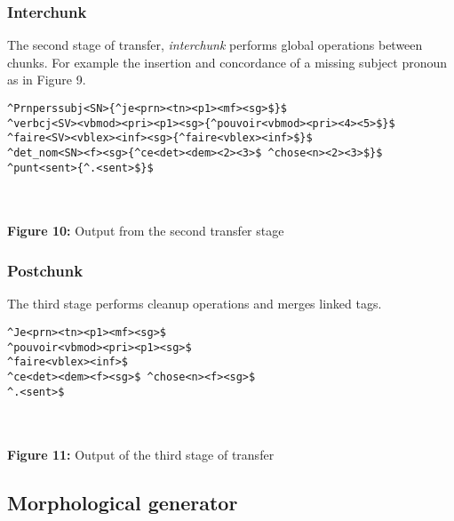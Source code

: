 \documentclass[a0,landscape]{a0poster}
\begin{document}
\begin{multicols}{4}
\subsubsection{Interchunk}

\noindent
The second stage of transfer, \emph{interchunk} performs global operations between chunks. For example
the insertion and concordance of a missing subject pronoun as in Figure 9.\\

\begin{center}
\begin{minipage}[b]{26cm}
\begin{small}
\begin{verbatim}
^Prnperssubj<SN>{^je<prn><tn><p1><mf><sg>$}$ 
^verbcj<SV><vbmod><pri><p1><sg>{^pouvoir<vbmod><pri><4><5>$}$ 
^faire<SV><vblex><inf><sg>{^faire<vblex><inf>$}$ 
^det_nom<SN><f><sg>{^ce<det><dem><2><3>$ ^chose<n><2><3>$}$
^punt<sent>{^.<sent>$}$
\end{verbatim}
\end{small}
\end{minipage}\\
~\\
\textbf{Figure 10:} Output from the second transfer stage
\end{center}

\subsubsection{Postchunk}

\noindent
The third stage performs cleanup operations and merges linked 
tags.\\

\begin{center}
\begin{minipage}[b]{25cm}
\begin{small}
\begin{verbatim}
^Je<prn><tn><p1><mf><sg>$ 
^pouvoir<vbmod><pri><p1><sg>$ 
^faire<vblex><inf>$ 
^ce<det><dem><f><sg>$ ^chose<n><f><sg>$
^.<sent>$
\end{verbatim}
\end{small}
\end{minipage}\\
~\\
\textbf{Figure 11:} Output of the third stage of transfer 
\end{center}

\subsection{Morphological generator}


\end{multicols}
\end{document}
